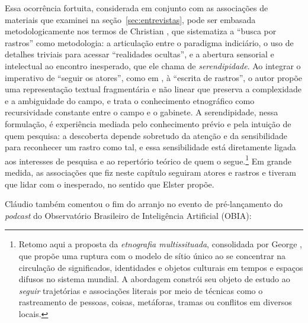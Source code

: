Essa ocorrência fortuita, considerada em conjunto com as associações de materiais que examinei na seção~\ref{sec:entrevistas}, pode ser embasada metodologicamente nos termos de Christian \textcite{elster2021follow}, que sistematiza a \enquote{busca por rastros} como metodologia: a articulação entre o paradigma indiciário, o uso de detalhes triviais para acessar \enquote{realidades ocultas}, e a abertura sensorial e intelectual ao encontro inesperado, que ele chama de \textit{serendipidade}. Ao integrar o imperativo de \enquote{seguir os atores}, como em \textcite{Latour2011CienciaEmAcao}, à \enquote{escrita de rastros}, o autor propõe uma representação textual fragmentária e não linear que preserva a complexidade e a ambiguidade do campo, e trata o conhecimento etnográfico como recursividade constante entre o campo e o gabinete. A serendipidade, nessa formulação, é experiência mediada pelo conhecimento prévio e pela intuição de quem pesquisa: a descoberta depende sobretudo da atenção e da sensibilidade para reconhecer um rastro como tal, e essa sensibilidade está diretamente ligada aos interesses de pesquisa e ao repertório teórico de quem o segue.\footnote{Retomo aqui a proposta da \textit{etnografia multissituada}, consolidada por George \textcite{marcus1995ethnography}, que propõe uma ruptura com o modelo de sítio único ao se concentrar na circulação de significados, identidades e objetos culturais em tempos e espaços difusos no sistema mundial. A abordagem constrói seu objeto de estudo ao \textit{seguir} trajetórias e associações literais por meio de técnicas como o rastreamento de pessoas, coisas, metáforas, tramas ou conflitos em diversos locais.} Em grande medida, as associações que fiz neste capítulo seguiram atores e rastros e tiveram que lidar com o inesperado, no sentido que Elster propõe.

Cláudio também comentou o fim do arranjo no evento de pré-lançamento do \textit{podcast} do Observatório Brasileiro de Inteligência Artificial (OBIA):

